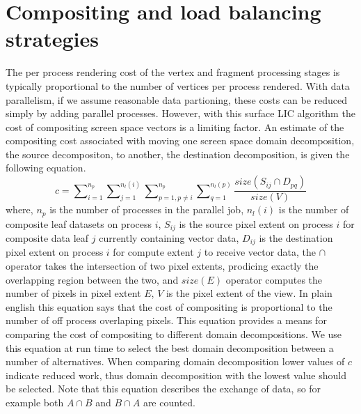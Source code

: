 \documentclass[a4paper,10pt]{article}
\begin{document}
\section{Compositing and load balancing strategies}
The per process rendering cost of the vertex and fragment processing stages is typically proportional to the number of vertices per process rendered. With data parallelism, if we assume reasonable data partioning, these costs can be reduced simply by adding parallel processes. However, with this surface LIC algorithm the cost of compositing screen space vectors is a limiting factor. An estimate of the compositing cost associated with moving one screen space domain decomposition, the source decompositon, to another, the destination decomposition, is given the following equation.
\begin{equation}
c = \sum\nolimits_{i=1}^{n_p} \sum\nolimits_{j=1}^{n_l(i)} \sum\nolimits_{p=1,p \neq i}^{n_p} \sum\nolimits_{q=1}^{n_l(p)} \frac{ size(S_{ij} \cap D_{pq}) }{ size(V) }
\label{eqn:comm-cost}
\end{equation}
where, $n_p$ is the number of processes in the parallel job, $n_l(i)$ is the number of composite leaf datasets on process $i$, $S_{ij}$ is the source pixel extent on process $i$ for composite data leaf $j$ currently containing vector data, $D_{ij}$ is the destination pixel extent on process $i$ for compute extent $j$ to receive vector data, the $\cap$ operator takes the intersection of two pixel extents, prodicing exactly the overlapping region between the two, and $size(E)$ operator computes the number of pixels in pixel extent $E$, $V$ is the pixel extent of the view. In plain english this equation says that the cost of compositing is proportional to the number of off process overlaping pixels. This equation provides a means for comparing the cost of compositing to different domain decompositions.  We use this equation at run time to select the best domain decomposition between a number of alternatives. When comparing domain decomposition lower values of $c$ indicate reduced work, thus domain decomposition with the lowest value should be selected. Note that this equation describes the exchange of data, so for example both $A \cap B$ and $B \cap A$ are counted.
\end{document}
